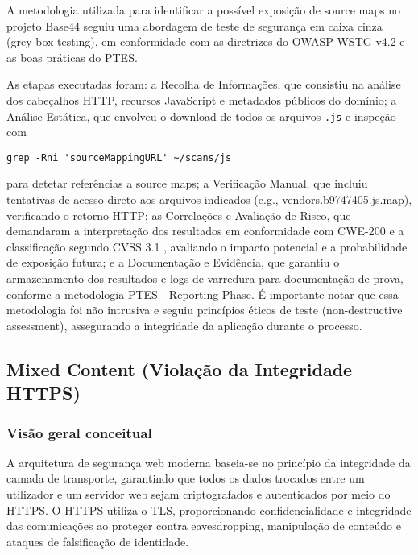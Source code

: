 A metodologia utilizada para identificar a possível exposição de source maps no projeto Base44 seguiu uma abordagem de teste de segurança em caixa cinza (grey-box testing), em conformidade com as diretrizes do OWASP WSTG v4.2 \cite{ref8} e as boas práticas do PTES. 

As etapas executadas foram: a Recolha de Informações, que consistiu na análise dos cabeçalhos HTTP, recursos JavaScript e metadados públicos do domínio; a Análise Estática, que envolveu o download de todos os arquivos \texttt{.js} e inspeção com  

\begin{verbatim}
grep -Rni 'sourceMappingURL' ~/scans/js
\end{verbatim}

para detetar referências a source maps; a Verificação Manual, que incluiu tentativas de acesso direto aos arquivos indicados (e.g., vendors.b9747405.js.map), verificando o retorno HTTP; as Correlações e Avaliação de Risco, que demandaram a interpretação dos resultados em conformidade com CWE-200 \cite{ref43} e a classificação segundo CVSS 3.1 \cite{ref46}, avaliando o impacto potencial e a probabilidade de exposição futura; e a Documentação e Evidência, que garantiu o armazenamento dos resultados e logs de varredura para documentação de prova, conforme a metodologia PTES - Reporting Phase. É importante notar que essa metodologia foi não intrusiva e seguiu princípios éticos de teste (non-destructive assessment), assegurando a integridade da aplicação durante o processo. 

\subsection{Mixed Content (Violação da Integridade HTTPS)}
\label{subsec:mixed-content}

\subsubsection{Visão geral conceitual}
\label{subsubsec:visao-geral-MC}

A arquitetura de segurança web moderna baseia-se no princípio da integridade da camada de transporte, garantindo que todos os dados trocados entre um utilizador e um servidor web sejam criptografados e autenticados por meio do HTTPS. O HTTPS utiliza o TLS, proporcionando confidencialidade e integridade das comunicações ao proteger contra eavesdropping, manipulação de conteúdo e ataques de falsificação de identidade. \cite{ref48}

